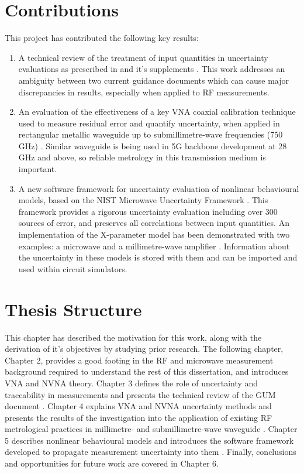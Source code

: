 \documentclass[../thesis/thesis.tex]{subfiles}
\begin{document}
\begin{refsection}
\section{Contributions}
This project has contributed the following key results:
\begin{enumerate}
	\item A technical review \cite{Stant_2016} of the treatment of input quantities in uncertainty evaluations as prescribed in \cite{GUM_2008} and it's supplements \cite{GUM_S1,GUM_S2}. This work addresses an ambiguity between two current guidance documents which can cause major discrepancies in results, especially when applied to RF measurements.
	\item An evaluation of the effectiveness of a key VNA coaxial calibration technique used to measure residual error and quantify uncertainty, when applied in rectangular metallic waveguide up to submillimetre-wave frequencies (750 GHz) \cite{Stant_2017}. Similar waveguide is being used in 5G backbone development at 28 GHz and above, so reliable metrology in this transmission medium is important.
	\item A new software framework for uncertainty evaluation of nonlinear behavioural models, based on the NIST Microwave Uncertainty Framework \cite{MUFWebsite}. This framework provides a rigorous uncertainty evaluation including over 300 sources of error, and preserves all correlations between input quantities. An implementation of the X-parameter model has been demonstrated with two examples: a microwave and a millimetre-wave amplifier \cite{Stant_2018_TMTT}. Information about the uncertainty in these models is stored with them and can be imported and used within circuit simulators.
\end{enumerate}

\section{Thesis Structure}
This chapter has described the motivation for this work, along with the derivation of it's objectives by studying prior research. The following chapter, Chapter 2, provides a good footing in the RF and microwave measurement background required to understand the rest of this dissertation, and introduces VNA and NVNA theory. Chapter 3 defines the role of uncertainty and traceability in measurements and presents the technical review of the GUM document \cite{Stant_2016}. Chapter 4 explains VNA and NVNA uncertainty methods and presents the results of the investigation into the application of existing RF metrological practices in millimetre- and submillimetre-wave waveguide \cite{Stant_2017}. Chapter 5 describes nonlinear behavioural models and introduces the software framework developed to propagate measurement uncertainty into them \cite{Stant_2018_TMTT}. Finally, conclusions and opportunities for future work are covered in Chapter 6.
\printbibliography
\end{refsection}
\end{document}
